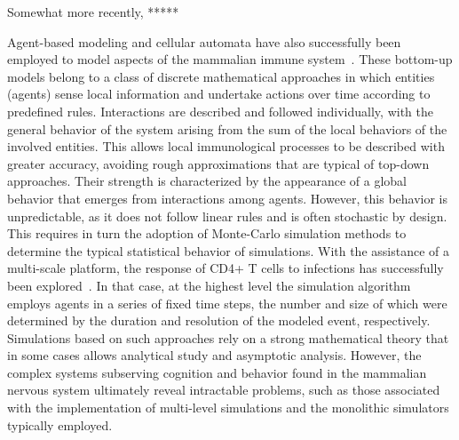 \documentclass{article}
\begin{document}
Somewhat more recently, *****

Agent-based modeling and cellular automata have also successfully been employed to model aspects of the mammalian immune system~\cite{chiacchio14}. These bottom-up models belong to a class of discrete mathematical approaches in which entities (agents) sense local information and undertake actions over time according to predefined rules. Interactions are described and followed individually, with the general behavior of the system arising from the sum of the local behaviors of the involved entities. This allows local immunological processes to be described with greater accuracy, avoiding rough approximations that are typical of top-down approaches. Their strength is characterized by the appearance of a global behavior that emerges from interactions among agents. However, this behavior is unpredictable, as it does not follow linear rules and is often stochastic by design. This requires in turn the adoption of Monte-Carlo simulation methods to determine the typical statistical behavior of simulations. With the assistance of a multi-scale platform, the response of CD4+ T cells to infections has successfully been explored~\cite{wertheim21}. In that case, at the highest level the simulation algorithm employs agents in a series of fixed time steps, the number and size of which were determined by the duration and resolution of the modeled event, respectively. Simulations based on such approaches rely on a strong mathematical theory that in some cases allows analytical study and asymptotic analysis. However, the complex systems subserving cognition and behavior found in the mammalian nervous system ultimately reveal intractable problems, such as those associated with the implementation of multi-level simulations and the monolithic simulators typically employed.
\end{document}
